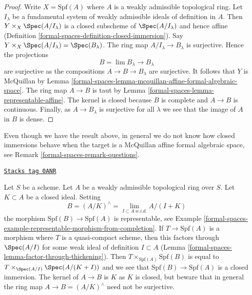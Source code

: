 \begin{proof}
Write $X = \text{Spf}(A)$ where $A$ is a weakly admissible topological ring.
Let $I_\lambda$ be a fundamental system of weakly admissible ideals
of definition in $A$. Then $Y \times_X \Spec(A/I_\lambda)$ is
a closed subscheme of $\Spec(A/I_\lambda)$
and hence affine (Definition \ref{formal-spaces-definition-closed-immersion}).
Say $Y \times_X \Spec(A/I_\lambda) = \Spec(B_\lambda)$.
The ring map $A/I_\lambda \to B_\lambda$
is surjective. Hence the projections
$$
B = \lim B_\lambda \longrightarrow B_\lambda
$$
are surjective as the compositions $A \to B \to B_\lambda$ are surjective.
It follows that $Y$ is McQuillan by
Lemma \ref{formal-spaces-lemma-mcquillan-affine-formal-algebraic-space}.
The ring map $A \to B$ is taut by Lemma \ref{formal-spaces-lemma-representable-affine}.
The kernel is closed because $B$ is complete and $A \to B$ is
continuous. Finally, as $A \to B_\lambda$ is surjective for all $\lambda$
we see that the image of $A$ in $B$ is dense.
\end{proof}

Even though we have the result above, in general we do not know how
closed immersions behave when the target is a
McQuillan affine formal algebraic space, see Remark \ref{formal-spaces-remark-questions}.

\begin{example}
\label{formal-spaces-example-closed-immersion-from-quotient}
\href{https://stacks.math.columbia.edu/tag/0ANR}{\texttt{Stacks tag 0ANR}}

Let $S$ be a scheme. Let $A$ be a weakly admissible topological ring over $S$.
Let $K \subset A$ be a closed ideal. Setting
$$
B = (A/K)^\wedge = \lim_{I \subset A\ w.i.d.} A/(I + K)
$$
the morphism $\text{Spf}(B) \to \text{Spf}(A)$ is representable, see
Example \ref{formal-spaces-example-representable-morphism-from-completion}.
If $T \to \text{Spf}(A)$ is a morphism where $T$ is a quasi-compact
scheme, then this factors through $\Spec(A/I)$ for some weak
ideal of definition $I \subset A$ (Lemma \ref{formal-spaces-lemma-factor-through-thickening}).
Then $T \times_{\text{Spf}(A)} \text{Spf}(B)$
is equal to $T \times_{\Spec(A/I)} \Spec(A/(K + I))$ and
we see that $\text{Spf}(B) \to \text{Spf}(A)$ is a closed immersion.
The kernel of $A \to B$ is $K$ as $K$ is closed, but
beware that in general the ring map $A \to B = (A/K)^\wedge$
need not be surjective.
\end{example}

